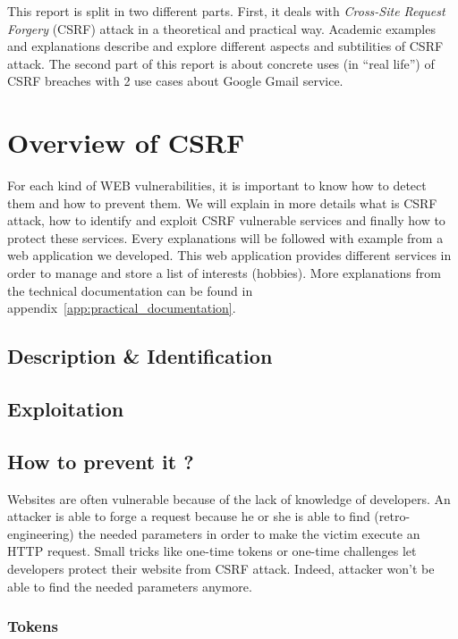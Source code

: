 \documentclass[a4paper,11pt,openany]{report}
\newcommand{\csrf}{\textit{Cross-Site Request Forgery}}
\begin{document}
  This report is split in two different parts. First, it deals with \csrf{} (CSRF) attack in 
  a theoretical and practical way. Academic examples and explanations describe and explore 
  different aspects and subtilities of CSRF attack. The second part of this report is about concrete 
  uses (in ``real life'') of CSRF breaches with 2 use cases about Google Gmail service.

  \section{Overview of CSRF}
  
  For each kind of WEB vulnerabilities, it is important to know how to detect them and 
  how to prevent them. We will explain in more details what is CSRF attack, how to 
  identify and exploit CSRF vulnerable services and finally how to protect these services. 
  Every explanations will be followed with example from a web application we developed. 
  This web application provides different services in order to manage and store a list of 
  interests (hobbies). More explanations from the technical documentation can be found 
  in appendix~\ref{app:practical_documentation}.
  
  \subsection{Description \& Identification}
  
  \subsection{Exploitation}
  
  \subsection{How to prevent it ?}
  Websites are often vulnerable because of the lack of knowledge of developers. An attacker is able 
  to forge a request because he or she is able to find (retro-engineering) the needed parameters in 
  order to make the victim execute an HTTP request. Small tricks like one-time tokens or one-time challenges let 
  developers protect their website from CSRF attack. Indeed, attacker won't be able to find the needed 
  parameters anymore.
  
  \subsubsection{Tokens}
  
\end{document}
